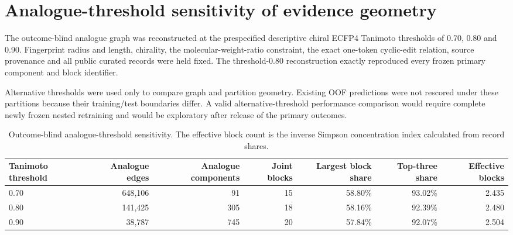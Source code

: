 \documentclass[10pt]{article}
\begin{document}
\section*{Analogue-threshold sensitivity of evidence geometry}

The outcome-blind analogue graph was reconstructed at the prespecified descriptive chiral ECFP4 Tanimoto thresholds of 0.70, 0.80 and 0.90. Fingerprint radius and length, chirality, the molecular-weight-ratio constraint, the exact one-token cyclic-edit relation, source provenance and all public curated records were held fixed. The threshold-0.80 reconstruction exactly reproduced every frozen primary component and block identifier.

Alternative thresholds were used only to compare graph and partition geometry. Existing OOF predictions were not rescored under these partitions because their training/test boundaries differ. A valid alternative-threshold performance comparison would require complete newly frozen nested retraining and would be exploratory after release of the primary outcomes.


\begin{table}[htbp]
\centering
\caption{Outcome-blind analogue-threshold sensitivity. The effective block count is the inverse Simpson concentration index calculated from record shares.}
\begin{adjustbox}{max width=\textwidth}
\begin{tabular}{lrrrrrr}
\toprule
\textbf{Tanimoto threshold} & \textbf{Analogue edges} & \textbf{Analogue components} & \textbf{Joint blocks} & \textbf{Largest block share} & \textbf{Top-three share} & \textbf{Effective blocks} \\
\midrule
0.70 & 648,106 & 91 & 15 & 58.80\% & 93.02\% & 2.435 \\
0.80 & 141,425 & 305 & 18 & 58.16\% & 92.39\% & 2.480 \\
0.90 & 38,787 & 745 & 20 & 57.84\% & 92.07\% & 2.504 \\
\bottomrule
\end{tabular}
\end{adjustbox}
\end{table}
\end{document}

